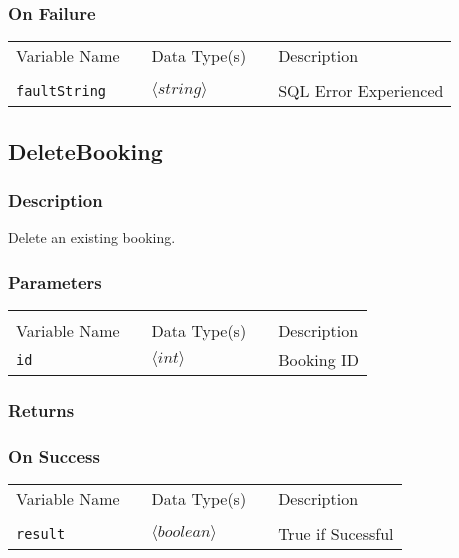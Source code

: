 \subsubsection{On Failure}

\begin{tabular}{lllll}
Variable Name	&		&	Data Type(s)		&	&	Description	\\
				&	&	&	&	\\
\verb!faultString! & \hspace{15mm} & $\langle string\rangle $ & \hspace{15mm} & SQL Error Experienced \\
\end{tabular}


\subsection{DeleteBooking}

\subsubsection{Description}

Delete an existing booking.

\subsubsection{Parameters}

\begin{tabular}{lllll}
				&	&	&	&	\\
Variable Name	&		&	Data Type(s)		&	&	Description	\\
\verb!id! & \hspace{15mm} & $\langle int\rangle $ & \hspace{15mm} & Booking ID \\
\end{tabular}

\subsubsection{Returns}

\subsubsection{On Success}

\begin{tabular}{lllll}
Variable Name	&		&	Data Type(s)		&	&	Description	\\
				&	&	&	&	\\
\verb!result! & \hspace{15mm} & $\langle boolean\rangle $ & \hspace{15mm} & True if Sucessful \\
\end{tabular}

